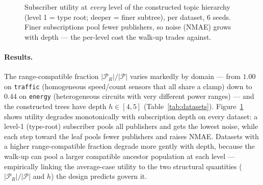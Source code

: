 \begin{figure}[t]\centering
{}
\caption{Subscriber utility at \emph{every} level of the constructed topic hierarchy (level 1 = type root; deeper = finer subtree), per dataset, 6 seeds. Finer subscriptions pool fewer publishers, so noise (NMAE) grows with depth --- the per-level cost the walk-up trades against.}\label{fig:exp-levels}
\end{figure}

\paragraph{Results.} The range-compatible fraction $|\mathcal{P}_R|/|\mathcal{P}|$ varies markedly by domain --- from $1.00$ on \texttt{traffic} (homogeneous speed/count sensors that all share a clamp) down to $0.44$ on \texttt{energy} (heterogeneous circuits with very different power ranges) --- and the constructed trees have depth $h\!\in\![4,5]$ (Table~\ref{tab:datasets}). Figure~\ref{fig:exp-levels} shows utility degrades monotonically with subscription depth on every dataset: a level-1 (type-root) subscriber pools all publishers and gets the lowest noise, while each step toward the leaf pools fewer publishers and raises NMAE. Datasets with a higher range-compatible fraction degrade more gently with depth, because the walk-up can pool a larger compatible ancestor population at each level --- empirically linking the average-case utility to the two structural quantities ($|\mathcal{P}_R|/|\mathcal{P}|$ and $h$) the design predicts govern it.

